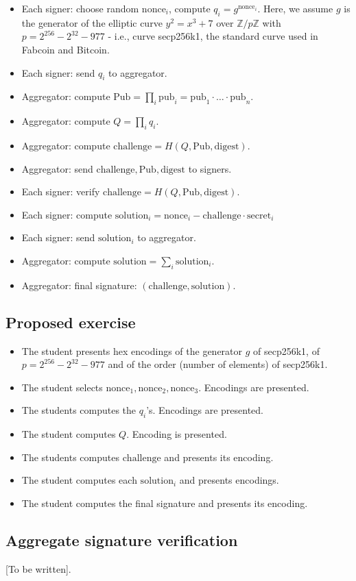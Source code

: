 \documentclass{article}
\begin{document}
\begin{itemize}
\item Each signer: choose random $\mathrm{nonce}_i$, compute $q_i = g^{\mathrm{nonce}_i}$. Here, we assume $g$ is the generator of the elliptic curve $y^2=x^3+7$ over $\mathbb Z/p\mathbb Z$ with $p = 2^{256}- 2^{32}-977$ - i.e., curve secp256k1, the standard curve used in Fabcoin and Bitcoin. 
\item Each signer: send $q_i$ to aggregator.  
\item Aggregator: compute $ \mathrm{Pub} =\prod_{i} \mathrm{pub}_i =\mathrm{pub}_1\cdot \dots \cdot \mathrm{pub}_n $. 
\item Aggregator: compute $ Q = \prod_i q_i$.
\item Aggregator: compute  $\mathrm{challenge} = H(Q, \mathrm{Pub}, \mathrm{digest})$.
\item Aggregator: send $\mathrm{challenge},\mathrm{Pub}, \mathrm{digest}$ to signers.
\item Each signer: verify $\mathrm{challenge} = H(Q, \mathrm {Pub}, \mathrm{digest}) $.
\item Each signer: compute $\mathrm{solution}_i = {\mathrm{nonce}_i - \mathrm{challenge} \cdot \mathrm{secret}_i} $
\item Each signer: send $\mathrm{solution}_i$ to aggregator.
\item Aggregator: compute $\mathrm{solution} = \sum_i \mathrm{solution}_i $.
\item Aggregator: final signature: $(\mathrm{challenge}, \mathrm{solution})$.

\end{itemize}

\subsection{Proposed exercise}
\begin{itemize}
\item The student presents hex encodings of the generator $g$ of secp256k1, of $p = 2^{256}- 2^{32}-977$ and of the order (number of elements) of secp256k1.
\item The student selects $\mathrm{nonce}_1, \mathrm{nonce}_2,\mathrm{nonce}_3$. Encodings are presented.

\item The students computes the $q_i$'s. Encodings are presented.
\item The student computes $Q$. Encoding is presented.
\item The students computes $\mathrm{challenge}$ and presents its encoding.
\item The student computes each $\mathrm{solution}_i$ and presents encodings.
\item The student computes the final signature and presents its encoding.
\end{itemize}


\subsection{Aggregate signature verification}
[To be written].



\end{document}
